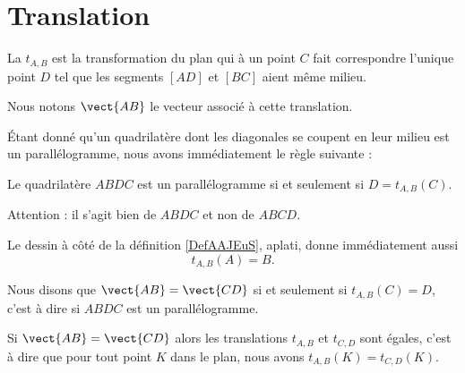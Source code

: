 
\section{Translation}

\begin{multicols}{2}
    \begin{definition}  \label{DefAAJEuS}
    La  \( t_{A,B}\) est la transformation du plan qui à un point \( C\) fait correspondre l'unique point \( D\) tel que les segments \( [AD]\) et \( [BC]\) aient même milieu.
\end{definition}

\columnbreak


\end{multicols}
Nous notons \( \vect{ AB }\) le vecteur associé à cette translation.

Étant donné qu'un quadrilatère dont les diagonales se coupent en leur milieu est un parallélogramme, nous avons immédiatement le règle suivante :
\begin{Aretenir}
    Le quadrilatère \( ABDC\) est un parallélogramme si et seulement si \( D=t_{A,B}(C)\).

Attention : il s'agit bien de \( ABDC\) et non de \( ABCD\).
\end{Aretenir}

Le dessin à côté de la définition \ref{DefAAJEuS}, aplati, donne immédiatement aussi
\begin{equation}
    t_{A,B}(A)=B.
\end{equation}

\begin{definition}
    Nous disons que \( \vect{ AB }=\vect{ CD }\) si et seulement si \( t_{A,B}(C)=D\), c'est à dire si \( ABDC\) est un parallélogramme.
\end{definition}

\begin{propriete}
    Si \( \vect{ AB }=\vect{ CD }\) alors les translations \( t_{A,B}\) et \( t_{C,D}\) sont égales, c'est à dire que pour tout point \( K\) dans le plan, nous avons \( t_{A,B}(K)=t_{C,D}(K)\).
\end{propriete}

